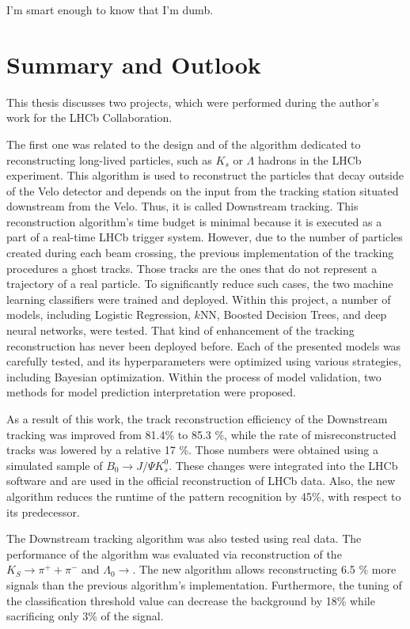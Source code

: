 \begin{savequote}[75mm] 
I'm smart enough to know that I'm dumb.

\end{savequote}

\chapter{Summary and Outlook}

This thesis discusses two projects, which were performed during the author's work for the LHCb Collaboration. 

The first one was related to the design and of the algorithm dedicated to reconstructing long-lived particles, such as $K_{s}$ or $\Lambda$ hadrons in the LHCb experiment. This algorithm is used to reconstruct the particles that decay outside of the Velo detector and depends on the input from the tracking station situated downstream from the Velo. Thus, it is called Downstream tracking. This reconstruction algorithm's time budget is minimal because it is executed as a part of a real-time LHCb trigger system.  However, due to the number of particles created during each beam crossing, the previous implementation of the tracking procedures a ghost tracks. Those tracks are the ones that do not represent a trajectory of a real particle.  To significantly reduce such cases, the two machine learning classifiers were trained and deployed. 
Within this project, a number of models, including Logistic Regression, $k$NN, Boosted Decision Trees, and deep neural networks, were tested.
That kind of enhancement of the tracking reconstruction has never been deployed before. 
Each of the presented models was carefully tested, and its hyperparameters were optimized using various strategies, including Bayesian optimization.  Within the process of model validation, two methods for model prediction interpretation were proposed. 

As a result of this work, the track reconstruction efficiency of the Downstream tracking was improved from 81.4\% to 85.3 \%, while the rate of misreconstructed tracks was lowered by a relative 17 \%. Those numbers were obtained using a simulated sample of  $B_0 \rightarrow J/\Psi K^{0}_{s}$. 
These changes were integrated into the LHCb software and are used in the official reconstruction of LHCb data. Also, the new algorithm reduces the runtime of the pattern recognition by 45\%, with respect to its predecessor.  

The Downstream tracking algorithm was also tested using real data. The performance of the algorithm was evaluated via reconstruction of the $K_S \rightarrow \pi^{+} + \pi^{-}$  and $\Lambda_{0} \rightarrow $.  The new algorithm allows reconstructing 6.5 \% more signals than the previous algorithm's implementation.   
Furthermore, the tuning of the classification threshold value can decrease the background by 18\% while sacrificing only 3\% of the signal. 

